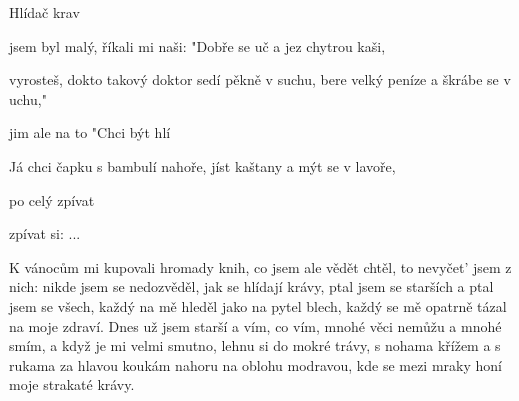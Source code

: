 \begin{TEXT}{Hlídač krav}

\SLOKA {} jsem byl malý, říkali mi naši: "Dobře se uč a jez chytrou kaši,\NL

    vyrosteš,  dokto\NL
   takový doktor sedí pěkně v suchu, bere velký peníze a škrábe se v uchu,"\NL

    jim ale na to  "Chci být hlí

\REFREN Já chci  čapku s bambulí nahoře, jíst kaštany a mýt se v lavoře,\NL

    po celý  zpívat \NL

   zpívat si:   ...

\SLOKA K vánocům mi kupovali hromady knih,\NL
   co jsem ale vědět chtěl, to nevyčet' jsem z nich:\NL
   nikde jsem se nedozvěděl, jak se hlídají krávy,\NL
   ptal jsem se starších a ptal jsem se všech,\NL
   každý na mě hleděl jako na pytel blech,\NL
   každý se mě opatrně tázal na moje zdraví.
\REFRENHRAJ
\SLOKA Dnes už jsem starší a vím, co vím,\NL
   mnohé věci nemůžu a mnohé smím,\NL
   a když je mi velmi smutno, lehnu si do mokré trávy,\NL
   s nohama křížem a s rukama za hlavou\NL
   koukám nahoru na oblohu modravou,\NL
   kde se mezi mraky honí moje strakaté krávy.
\REFRENHRAJ
\end{TEXT}
